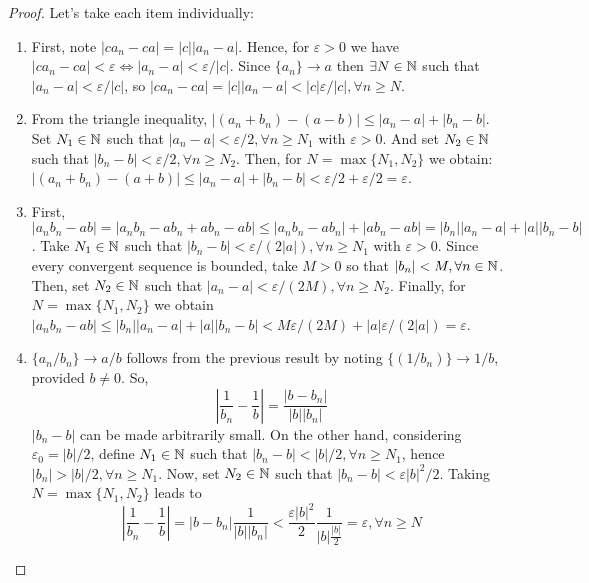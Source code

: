 \begin{proof}
    Let's take each item individually:
    \begin{enumerate}
        \item First, note $|ca_n - ca| = |c||a_n - a|$. Hence, for $\varepsilon > 0$ we have $|ca_n - ca| < \varepsilon \Leftrightarrow |a_n-a| < \varepsilon/|c|$. Since $\{ a_n \} \to a$ then $\exists N \in \mathbb{N}$ such that $|a_n - a| < \varepsilon / |c|$, so $|ca_n - ca| = |c||a_n-a| < |c|\varepsilon/|c|, \forall n \geq N$.
        \item From the triangle inequality, $|(a_n+b_n)-(a-b)| \leq |a_n-a|+|b_n-b|$. Set $N_1 \in \mathbb{N}$ such that $|a_n-a|< \varepsilon/2, \forall n \geq N_1$ with $\varepsilon > 0$. And set $N_2 \in \mathbb{N}$ such that $|b_n-b| < \varepsilon/2, \forall n \geq N_2$. Then, for $N = \max \{ N_1, N_2\}$ we obtain: $|(a_n+b_n)-(a+b)| \leq |a_n-a| + |b_n-b| < \varepsilon/2 + \varepsilon/2 = \varepsilon$.
        \item First, $|a_nb_n - ab| = |a_nb_n -ab_n + ab_n - ab| \leq |a_nb_n-ab_n| + |ab_n - ab| = |b_n||a_n-a| + |a||b_n-b|$. Take $N_1 \in \mathbb{N}$ such that $|b_n-b| < \varepsilon/(2|a|), \forall n \geq N_1$ with $\varepsilon > 0$. Since every convergent sequence is bounded, take $M > 0$ so that $|b_n| < M, \forall n \in \mathbb{N}$. Then, set $N_2 \in \mathbb{N}$ such that $|a_n-a| < \varepsilon/(2M), \forall n \geq N_2$. Finally, for $N = \max \{ N_1, N_2\}$ we obtain $|a_nb_n - ab| \leq |b_n||a_n-a| + |a||b_n-b| < M\varepsilon/(2M) + |a|\varepsilon/(2|a|) = \varepsilon$.
        \item $\{ a_n/b_n\} \to a/b$ follows from the previous result by noting $\{(1/b_n)\} \to 1/b$, provided $b \ne 0$. So,
        \begin{equation*}
            \left |
            \frac{1}{b_n} - \frac{1}{b}
            \right | = \frac{|b -b_n|}{|b||b_n|}
        \end{equation*}
        $|b_n-b|$ can be made arbitrarily small. On the other hand, considering $\varepsilon_0 = |b|/2$, define $N_1 \in \mathbb{N}$ such that $|b_n-b|<|b|/2, \forall n \geq N_1$, hence $|b_n| > |b|/2, \forall n \geq N_1$. Now, set $N_2 \in \mathbb{N}$ such that $|b_n-b| < \varepsilon|b|^2/2$. Taking $N = \max \{ N_1, N_2\}$ leads to
        \begin{equation*}
            \left|
                \frac{1}{b_n} - \frac{1}{b}
                \right| = 
                |b-b_n|\frac{1}{|b||b_n|} < \frac{\varepsilon |b|^2}{2} \frac{1}{|b|\frac{|b|}{2}} = \varepsilon, \forall n \geq N
        \end{equation*}
    \end{enumerate}
\end{proof}

